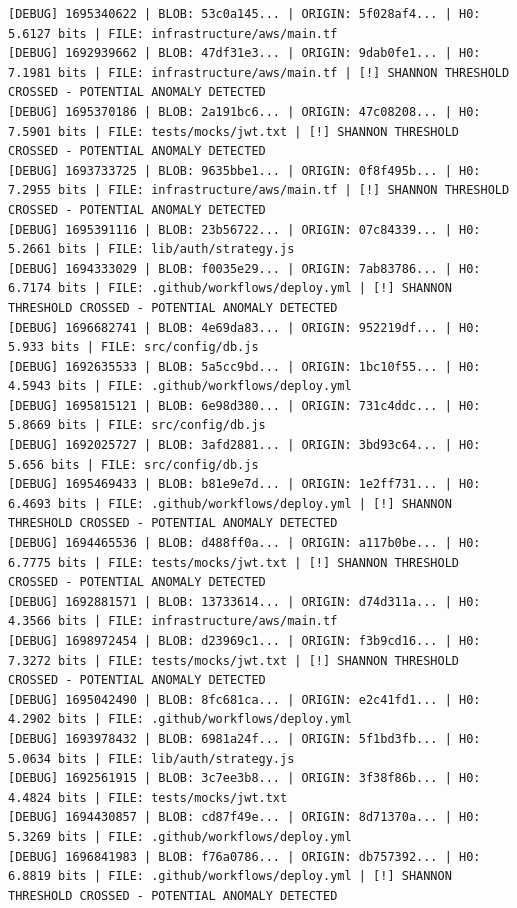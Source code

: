 \documentclass[12pt, a4paper, oneside]{report}
\begin{document}
\begin{lstlisting}[basicstyle=\tiny\ttfamily]
[DEBUG] 1695340622 | BLOB: 53c0a145... | ORIGIN: 5f028af4... | H0: 5.6127 bits | FILE: infrastructure/aws/main.tf
[DEBUG] 1692939662 | BLOB: 47df31e3... | ORIGIN: 9dab0fe1... | H0: 7.1981 bits | FILE: infrastructure/aws/main.tf | [!] SHANNON THRESHOLD CROSSED - POTENTIAL ANOMALY DETECTED
[DEBUG] 1695370186 | BLOB: 2a191bc6... | ORIGIN: 47c08208... | H0: 7.5901 bits | FILE: tests/mocks/jwt.txt | [!] SHANNON THRESHOLD CROSSED - POTENTIAL ANOMALY DETECTED
[DEBUG] 1693733725 | BLOB: 9635bbe1... | ORIGIN: 0f8f495b... | H0: 7.2955 bits | FILE: infrastructure/aws/main.tf | [!] SHANNON THRESHOLD CROSSED - POTENTIAL ANOMALY DETECTED
[DEBUG] 1695391116 | BLOB: 23b56722... | ORIGIN: 07c84339... | H0: 5.2661 bits | FILE: lib/auth/strategy.js
[DEBUG] 1694333029 | BLOB: f0035e29... | ORIGIN: 7ab83786... | H0: 6.7174 bits | FILE: .github/workflows/deploy.yml | [!] SHANNON THRESHOLD CROSSED - POTENTIAL ANOMALY DETECTED
[DEBUG] 1696682741 | BLOB: 4e69da83... | ORIGIN: 952219df... | H0: 5.933 bits | FILE: src/config/db.js
[DEBUG] 1692635533 | BLOB: 5a5cc9bd... | ORIGIN: 1bc10f55... | H0: 4.5943 bits | FILE: .github/workflows/deploy.yml
[DEBUG] 1695815121 | BLOB: 6e98d380... | ORIGIN: 731c4ddc... | H0: 5.8669 bits | FILE: src/config/db.js
[DEBUG] 1692025727 | BLOB: 3afd2881... | ORIGIN: 3bd93c64... | H0: 5.656 bits | FILE: src/config/db.js
[DEBUG] 1695469433 | BLOB: b81e9e7d... | ORIGIN: 1e2ff731... | H0: 6.4693 bits | FILE: .github/workflows/deploy.yml | [!] SHANNON THRESHOLD CROSSED - POTENTIAL ANOMALY DETECTED
[DEBUG] 1694465536 | BLOB: d488ff0a... | ORIGIN: a117b0be... | H0: 6.7775 bits | FILE: tests/mocks/jwt.txt | [!] SHANNON THRESHOLD CROSSED - POTENTIAL ANOMALY DETECTED
[DEBUG] 1692881571 | BLOB: 13733614... | ORIGIN: d74d311a... | H0: 4.3566 bits | FILE: infrastructure/aws/main.tf
[DEBUG] 1698972454 | BLOB: d23969c1... | ORIGIN: f3b9cd16... | H0: 7.3272 bits | FILE: tests/mocks/jwt.txt | [!] SHANNON THRESHOLD CROSSED - POTENTIAL ANOMALY DETECTED
[DEBUG] 1695042490 | BLOB: 8fc681ca... | ORIGIN: e2c41fd1... | H0: 4.2902 bits | FILE: .github/workflows/deploy.yml
[DEBUG] 1693978432 | BLOB: 6981a24f... | ORIGIN: 5f1bd3fb... | H0: 5.0634 bits | FILE: lib/auth/strategy.js
[DEBUG] 1692561915 | BLOB: 3c7ee3b8... | ORIGIN: 3f38f86b... | H0: 4.4824 bits | FILE: tests/mocks/jwt.txt
[DEBUG] 1694430857 | BLOB: cd87f49e... | ORIGIN: 8d71370a... | H0: 5.3269 bits | FILE: .github/workflows/deploy.yml
[DEBUG] 1696841983 | BLOB: f76a0786... | ORIGIN: db757392... | H0: 6.8819 bits | FILE: .github/workflows/deploy.yml | [!] SHANNON THRESHOLD CROSSED - POTENTIAL ANOMALY DETECTED

\end{lstlisting}
\end{document}

